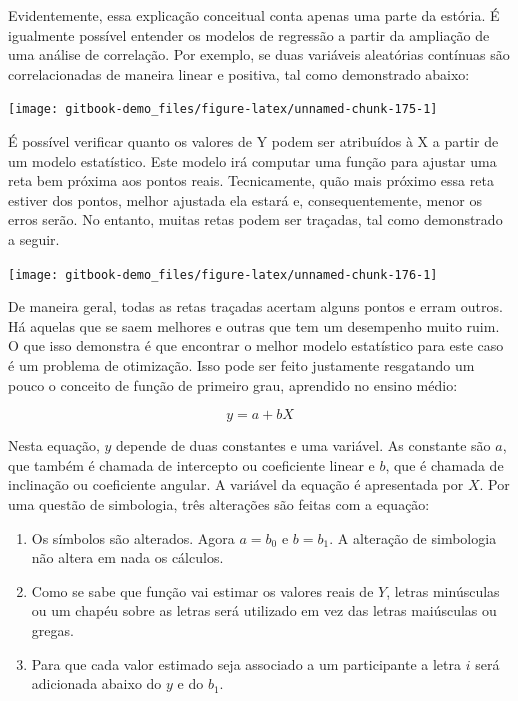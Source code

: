 \documentclass[
]{book}
\begin{document}
Evidentemente, essa explicação conceitual conta apenas uma parte da estória. É igualmente possível entender os modelos de regressão a partir da ampliação de uma análise de correlação. Por exemplo, se duas variáveis aleatórias contínuas são correlacionadas de maneira linear e positiva, tal como demonstrado abaixo:

\begin{center}\texttt{[image: gitbook-demo\_files/figure-latex/unnamed-chunk-175-1]} \end{center}

É possível verificar quanto os valores de Y podem ser atribuídos à X a partir de um modelo estatístico. Este modelo irá computar uma função para ajustar uma reta bem próxima aos pontos reais. Tecnicamente, quão mais próximo essa reta estiver dos pontos, melhor ajustada ela estará e, consequentemente, menor os erros serão. No entanto, muitas retas podem ser traçadas, tal como demonstrado a seguir.

\begin{center}\texttt{[image: gitbook-demo\_files/figure-latex/unnamed-chunk-176-1]} \end{center}

De maneira geral, todas as retas traçadas acertam alguns pontos e erram outros. Há aquelas que se saem melhores e outras que tem um desempenho muito ruim. O que isso demonstra é que encontrar o melhor modelo estatístico para este caso é um problema de otimização. Isso pode ser feito justamente resgatando um pouco o conceito de função de primeiro grau, aprendido no ensino médio:

\[y = a + bX\]

Nesta equação, \(y\) depende de duas constantes e uma variável. As constante são \(a\), que também é chamada de intercepto ou coeficiente linear e \(b\), que é chamada de inclinação ou coeficiente angular. A variável da equação é apresentada por \(X\). Por uma questão de simbologia, três alterações são feitas com a equação:

\begin{enumerate}
\def\labelenumi{(\roman{enumi})}
\item
  Os símbolos são alterados. Agora \(a = b_0\) e \(b = b_1\). A alteração de simbologia não altera em nada os cálculos.
\item
  Como se sabe que função vai estimar os valores reais de \(Y\), letras minúsculas ou um chapéu sobre as letras será utilizado em vez das letras maiúsculas ou gregas.
\item
  Para que cada valor estimado seja associado a um participante a letra \(i\) será adicionada abaixo do \(y\) e do \(b_1\).
\end{enumerate}
\end{document}
